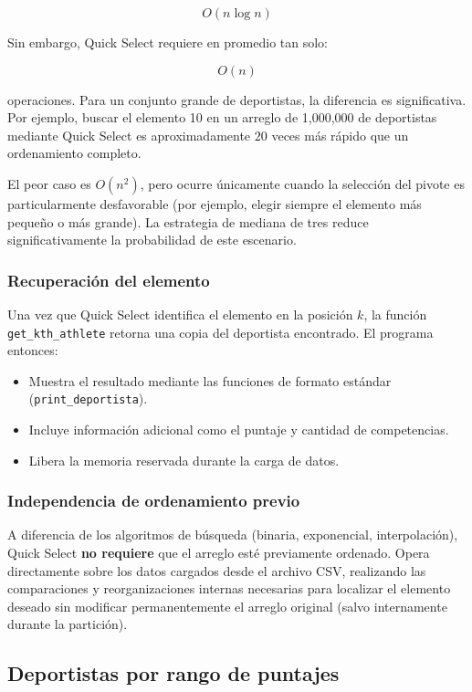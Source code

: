 \[
O(n \log n)
\]

Sin embargo, Quick Select requiere en promedio tan solo:

\[
O(n)
\]

operaciones. Para un conjunto grande de deportistas, la diferencia es significativa. Por ejemplo, buscar el elemento 10 en un arreglo de 1,000,000 de deportistas mediante Quick Select es aproximadamente \(20\) veces más rápido que un ordenamiento completo.

El peor caso es \(O(n^2)\), pero ocurre únicamente cuando la selección del pivote es particularmente desfavorable (por ejemplo, elegir siempre el elemento más pequeño o más grande). La estrategia de mediana de tres reduce significativamente la probabilidad de este escenario.

\subsubsection{Recuperación del elemento}

Una vez que Quick Select identifica el elemento en la posición \(k\), la función \texttt{get\_kth\_athlete} retorna una copia del deportista encontrado. El programa entonces:

\begin{itemize}
    \item Muestra el resultado mediante las funciones de formato estándar (\texttt{print\_deportista}).
    \item Incluye información adicional como el puntaje y cantidad de competencias.
    \item Libera la memoria reservada durante la carga de datos.
\end{itemize}

\subsubsection{Independencia de ordenamiento previo}

A diferencia de los algoritmos de búsqueda (binaria, exponencial, interpolación), Quick Select \textbf{no requiere} que el arreglo esté previamente ordenado. Opera directamente sobre los datos cargados desde el archivo CSV, realizando las comparaciones y reorganizaciones internas necesarias para localizar el elemento deseado sin modificar permanentemente el arreglo original (salvo internamente durante la partición).

\subsection{Deportistas por rango de puntajes}

